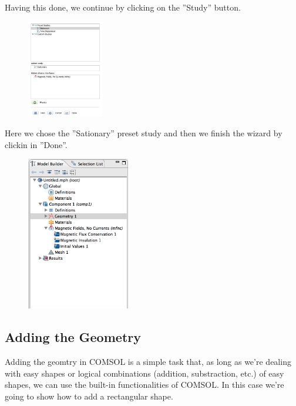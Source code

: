 Having this done, we continue by clicking on the ''Study'' button.\\

\begin{figure}[H]
	\centering
  \includegraphics[width=0.3\textwidth]{Pictures/Screenshots/Sim25.png}
\end{figure}

Here we chose the ''Sationary'' preset study and then we finish the wizard by clickin in  ''Done''.

\begin{figure}[H]
	\centering
  \includegraphics[width=0.4\textwidth]{Pictures/Screenshots/Sim4.png}
\end{figure}


\subsection{Adding the Geometry}

Adding the geomtry in COMSOL is a simple task that, as long as we're dealing with easy shapes or logical combinations (addition, substraction, etc.) of easy shapes, we can use the built-in functionalities of COMSOL. In this case we're going to show how to add a rectangular shape.\\

